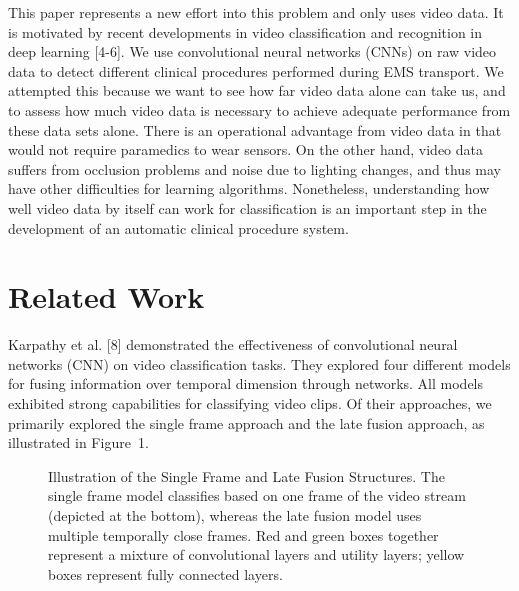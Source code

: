 \documentclass[letterpaper, 10 pt, conference]{ieeeconf}  %
\begin{document}
This paper represents a new effort into this problem and only uses video data. It is motivated by recent developments in video classification and recognition in deep learning [4-6]. We use convolutional neural networks (CNNs) on raw video data to detect different clinical procedures performed during EMS transport. We attempted this because we want to see how far video data alone can take us, and to assess how much video data is necessary to achieve adequate performance from these data sets alone. There is an operational advantage from video data in that would not require paramedics to wear sensors. On the other hand, video data suffers from occlusion problems and noise due to lighting changes, and thus may have other difficulties for learning algorithms. Nonetheless, understanding how well video data by itself can work for classification is an important step in the development of an automatic clinical procedure system.

\section{Related Work}

Karpathy et al. [8] demonstrated the effectiveness of convolutional neural networks (CNN) on video classification tasks. They explored four different models for fusing information over temporal dimension through networks. All models exhibited strong capabilities for classifying video clips. Of their approaches, we primarily explored the single frame approach and the late fusion approach, as illustrated in Figure~1. 
\begin{figure}[!htb]
        \caption{\label{fig: sampling} Illustration of the Single Frame and Late Fusion Structures. The single frame model classifies based on one frame of the video stream (depicted at the bottom), whereas the late fusion model uses multiple temporally close frames. Red and green boxes together represent a mixture of convolutional layers and utility layers; yellow boxes represent fully connected layers. }
      \end{figure}
      
\end{document}

